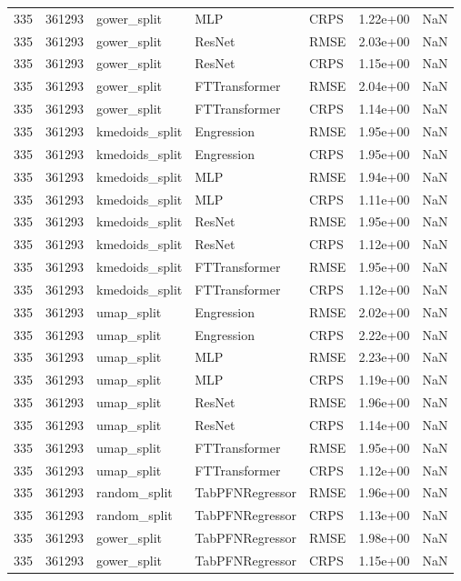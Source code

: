 \begin{tabular}{rrlllrr}
335 & 361293 & gower\_split & MLP & CRPS & 1.22e+00 & NaN \\
335 & 361293 & gower\_split & ResNet & RMSE & 2.03e+00 & NaN \\
335 & 361293 & gower\_split & ResNet & CRPS & 1.15e+00 & NaN \\
335 & 361293 & gower\_split & FTTransformer & RMSE & 2.04e+00 & NaN \\
335 & 361293 & gower\_split & FTTransformer & CRPS & 1.14e+00 & NaN \\
335 & 361293 & kmedoids\_split & Engression & RMSE & 1.95e+00 & NaN \\
335 & 361293 & kmedoids\_split & Engression & CRPS & 1.95e+00 & NaN \\
335 & 361293 & kmedoids\_split & MLP & RMSE & 1.94e+00 & NaN \\
335 & 361293 & kmedoids\_split & MLP & CRPS & 1.11e+00 & NaN \\
335 & 361293 & kmedoids\_split & ResNet & RMSE & 1.95e+00 & NaN \\
335 & 361293 & kmedoids\_split & ResNet & CRPS & 1.12e+00 & NaN \\
335 & 361293 & kmedoids\_split & FTTransformer & RMSE & 1.95e+00 & NaN \\
335 & 361293 & kmedoids\_split & FTTransformer & CRPS & 1.12e+00 & NaN \\
335 & 361293 & umap\_split & Engression & RMSE & 2.02e+00 & NaN \\
335 & 361293 & umap\_split & Engression & CRPS & 2.22e+00 & NaN \\
335 & 361293 & umap\_split & MLP & RMSE & 2.23e+00 & NaN \\
335 & 361293 & umap\_split & MLP & CRPS & 1.19e+00 & NaN \\
335 & 361293 & umap\_split & ResNet & RMSE & 1.96e+00 & NaN \\
335 & 361293 & umap\_split & ResNet & CRPS & 1.14e+00 & NaN \\
335 & 361293 & umap\_split & FTTransformer & RMSE & 1.95e+00 & NaN \\
335 & 361293 & umap\_split & FTTransformer & CRPS & 1.12e+00 & NaN \\
335 & 361293 & random\_split & TabPFNRegressor & RMSE & 1.96e+00 & NaN \\
335 & 361293 & random\_split & TabPFNRegressor & CRPS & 1.13e+00 & NaN \\
335 & 361293 & gower\_split & TabPFNRegressor & RMSE & 1.98e+00 & NaN \\
335 & 361293 & gower\_split & TabPFNRegressor & CRPS & 1.15e+00 & NaN \\

\end{tabular}
